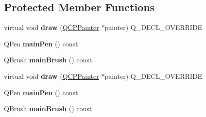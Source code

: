 \subsection*{Protected Member Functions}
\begin{DoxyCompactItemize}
\item 
\mbox{\label{class_q_c_p_item_tracer_a11f187ffea436434f3b5cfc387811967}} 
virtual void {\bfseries draw} (\hyperlink{class_q_c_p_painter}{Q\+C\+P\+Painter} $\ast$painter) Q\+\_\+\+D\+E\+C\+L\+\_\+\+O\+V\+E\+R\+R\+I\+DE
\item 
\mbox{\label{class_q_c_p_item_tracer_abffdcf64d0f84f7b41bd4af07d144642}} 
Q\+Pen {\bfseries main\+Pen} () const
\item 
\mbox{\label{class_q_c_p_item_tracer_a94f81c54197577e86c53a60cf39155cd}} 
Q\+Brush {\bfseries main\+Brush} () const
\item 
\mbox{\label{class_q_c_p_item_tracer_aad802fc9727825e4e96acaf4ec408b1e}} 
virtual void {\bfseries draw} (\hyperlink{class_q_c_p_painter}{Q\+C\+P\+Painter} $\ast$painter) Q\+\_\+\+D\+E\+C\+L\+\_\+\+O\+V\+E\+R\+R\+I\+DE
\item 
\mbox{\label{class_q_c_p_item_tracer_abffdcf64d0f84f7b41bd4af07d144642}} 
Q\+Pen {\bfseries main\+Pen} () const
\item 
\mbox{\label{class_q_c_p_item_tracer_a94f81c54197577e86c53a60cf39155cd}} 
Q\+Brush {\bfseries main\+Brush} () const
\end{DoxyCompactItemize}
